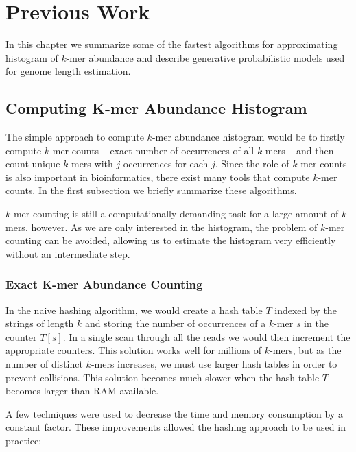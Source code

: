 \chapter{Previous Work}

In this chapter we summarize some of the fastest algorithms for approximating histogram of $k$-mer abundance 
and describe generative probabilistic models used for genome length estimation.

\section{Computing K-mer Abundance Histogram}
\label{sec:algorithms}

The simple approach to compute $k$-mer abundance histogram would be to firstly compute $k$-mer counts --
exact number of occurrences of all $k$-mers -- and then count unique $k$-mers with $j$ occurrences for each $j$.
Since the role of $k$-mer counts is also important in bioinformatics, there exist many tools that
compute $k$-mer counts. In the first subsection we briefly summarize these algorithms.

$k$-mer counting is still a computationally demanding task for a large amount of $k$-mers, however.
As we are only interested in the histogram, the problem of $k$-mer counting can be avoided,
allowing us to estimate the histogram very efficiently without an intermediate step.

\subsection{Exact K-mer Abundance Counting}
\label{sec:exact-algorithms}
In the naive hashing algorithm, we would create a hash table $T$ indexed by the strings of length $k$
and storing the number of occurrences of a $k$-mer $s$ in the counter $T[s]$. In a single scan through all the reads we
would then increment the appropriate counters. This solution works well for millions of $k$-mers, but as
the number of distinct $k$-mers increases, we must use larger hash tables in order to prevent collisions.
This solution becomes much slower when the hash table $T$ becomes larger than RAM available.

A few techniques were used to decrease the time and memory consumption by a constant factor. 
These improvements allowed the hashing approach to be used in practice:

